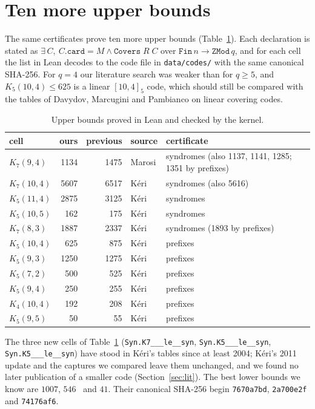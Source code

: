 \documentclass[11pt]{amsart}
\theoremstyle{definition}
\theoremstyle{remark}
\begin{document}
\section{Ten more upper bounds}
The same certificates prove ten more upper bounds (Table~\ref{tab:other}).
Each declaration is stated as $\exists\,C,\ C.\mathtt{card}=M\wedge\texttt{Covers}\;R\;C$ over $\mathtt{Fin}\,n\to\mathtt{ZMod}\,q$, and for each cell the list in Lean decodes to the code file in \texttt{data/\allowbreak codes/} with the same canonical SHA-256.
For $q=4$ our literature search was weaker than for $q\ge 5$, and $K_5(10,4)\le 625$ is a linear $[10,4]_5$ code, which should still be compared with the tables of Davydov, Marcugini and Pambianco on linear covering codes.

\begin{table}[ht]
\centering
\begin{tabular}{@{}lrrll@{}}
\toprule
cell & ours & previous & source & certificate \\
\midrule
$K_7(9,4)$ & 1134 & 1475 & Marosi & syndromes (also 1137, 1141, 1285; 1351 by prefixes) \\
$K_7(10,4)$ & 5607 & 6517 & Kéri & syndromes (also 5616) \\
$K_5(11,4)$ & 2875 & 3125 & Kéri & syndromes \\
$K_5(10,5)$ & 162 & 175 & Kéri & syndromes \\
$K_7(8,3)$ & 1887 & 2337 & Kéri & syndromes (1893 by prefixes) \\
$K_5(10,4)$ & 625 & 875 & Kéri & prefixes \\
$K_5(9,3)$ & 1250 & 1275 & Kéri & prefixes \\
$K_5(7,2)$ & 500 & 525 & Kéri & prefixes \\
$K_5(9,4)$ & 250 & 255 & Kéri & prefixes \\
$K_4(10,4)$ & 192 & 208 & Kéri & prefixes \\
$K_5(9,5)$ & 50 & 55 & Kéri & prefixes \\
\bottomrule
\end{tabular}
\caption{Upper bounds proved in Lean and checked by the kernel.}
\label{tab:other}
\end{table}

The three new cells of Table~\ref{tab:other} (\texttt{Syn.\allowbreak K7\_\_\_\allowbreak le\_\_\allowbreak syn}, \texttt{Syn.\allowbreak K5\_\_\_\allowbreak le\_\_\allowbreak syn}, \texttt{Syn.\allowbreak K5\_\_\_\allowbreak le\_\_\allowbreak syn}) have stood in Kéri's tables since at least 2004; Kéri's 2011 update and the captures we compared leave them unchanged, and we found no later publication of a smaller code (Section~\ref{sec:lit}).
The best lower bounds we know are $1007$, $546$~\cite{gp2025} and $41$.
Their canonical SHA-256 begin \texttt{7670a7bd}, \texttt{2a700e2f} and \texttt{74176af6}.
\end{document}
